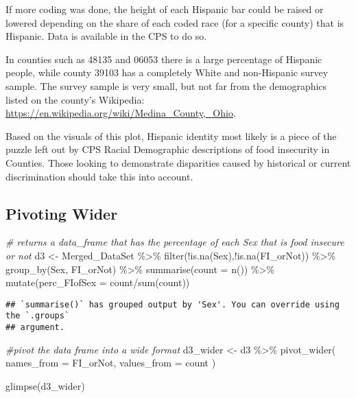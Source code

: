 \documentclass[
]{article}
\newenvironment{Shaded}{\begin{snugshade}}{\end{snugshade}}
\newcommand{\AttributeTok}[1]{\textcolor[rgb]{0.77,0.63,0.00}{#1}}
\newcommand{\CommentTok}[1]{\textcolor[rgb]{0.56,0.35,0.01}{\textit{#1}}}
\newcommand{\FunctionTok}[1]{\textcolor[rgb]{0.00,0.00,0.00}{#1}}
\newcommand{\NormalTok}[1]{#1}
\newcommand{\OtherTok}[1]{\textcolor[rgb]{0.56,0.35,0.01}{#1}}
\newcommand{\SpecialCharTok}[1]{\textcolor[rgb]{0.00,0.00,0.00}{#1}}
\begin{document}
If more coding was done, the height of each Hispanic bar could be raised
or lowered depending on the share of each coded race (for a specific
county) that is Hispanic. Data is available in the CPS to do so.

In counties such as 48135 and 06053 there is a large percentage of
Hispanic people, while county 39103 has a completely White and
non-Hispanic survey sample. The survey sample is very small, but not far
from the demographics listed on the county's Wikipedia:
\url{https://en.wikipedia.org/wiki/Medina_County,_Ohio}.

Based on the visuals of this plot, Hispanic identity most likely is a
piece of the puzzle left out by CPS Racial Demographic descriptions of
food insecurity in Counties. Those looking to demonstrate disparities
caused by historical or current discrimination should take this into
account.

\hypertarget{pivoting-wider}{%
\subsection{Pivoting Wider}\label{pivoting-wider}}

\begin{Shaded}
\begin{Highlighting}[]
\CommentTok{\# returns a data\_frame that has the percentage of each Sex that is food insecure or not}
\NormalTok{d3 }\OtherTok{\textless{}{-}}\NormalTok{ Merged\_DataSet }\SpecialCharTok{\%\textgreater{}\%} \FunctionTok{filter}\NormalTok{(}\SpecialCharTok{!}\FunctionTok{is.na}\NormalTok{(Sex),}\SpecialCharTok{!}\FunctionTok{is.na}\NormalTok{(FI\_orNot)) }\SpecialCharTok{\%\textgreater{}\%} 
  \FunctionTok{group\_by}\NormalTok{(Sex, FI\_orNot) }\SpecialCharTok{\%\textgreater{}\%} 
  \FunctionTok{summarise}\NormalTok{(}\AttributeTok{count =} \FunctionTok{n}\NormalTok{()) }\SpecialCharTok{\%\textgreater{}\%} 
  \FunctionTok{mutate}\NormalTok{(}\AttributeTok{perc\_FIofSex =}\NormalTok{ count}\SpecialCharTok{/}\FunctionTok{sum}\NormalTok{(count))}
\end{Highlighting}
\end{Shaded}

\begin{verbatim}
## `summarise()` has grouped output by 'Sex'. You can override using the `.groups`
## argument.
\end{verbatim}

\begin{Shaded}
\begin{Highlighting}[]
\CommentTok{\#pivot the data frame into a wide format}
\NormalTok{d3\_wider }\OtherTok{\textless{}{-}}\NormalTok{ d3 }\SpecialCharTok{\%\textgreater{}\%} 
  \FunctionTok{pivot\_wider}\NormalTok{(}
    \AttributeTok{names\_from =}\NormalTok{ FI\_orNot, }
    \AttributeTok{values\_from =}\NormalTok{ count}
\NormalTok{  )}

\FunctionTok{glimpse}\NormalTok{(d3\_wider)}
\end{Highlighting}
\end{Shaded}
\end{document}
